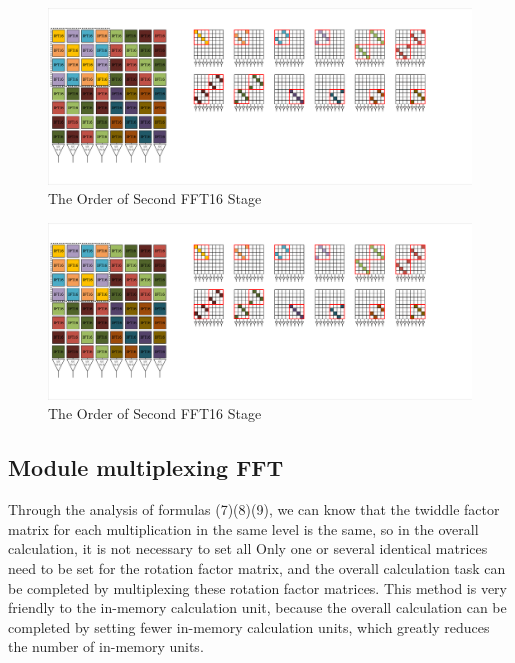 \documentclass[journal]{IEEEtran}
\begin{document}
\begin{figure}[h]
\centering
\includegraphics[scale=0.2]{figures/figure8.pdf}
\caption{The Order of Second FFT16 Stage}
\end{figure}

\begin{figure}[h]
\centering
\includegraphics[scale=0.2]{figures/figure9.pdf}
\caption{The Order of Second FFT16 Stage}
\end{figure}


\subsection{Module multiplexing FFT}
Through the analysis of formulas (7)(8)(9), we can know that the twiddle factor matrix for each multiplication in the same level is the same, so in the overall calculation, it is not necessary to set all Only one or several identical matrices need to be set for the rotation factor matrix, and the overall calculation task can be completed by multiplexing these rotation factor matrices. This method is very friendly to the in-memory calculation unit, because the overall calculation can be completed by setting fewer in-memory calculation units, which greatly reduces the number of in-memory units.
\end{document}
